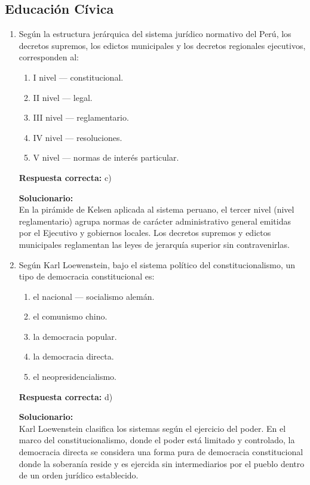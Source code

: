 \subsection*{Educación Cívica}

\begin{enumerate}
	
	\item Según la estructura jerárquica del sistema jurídico normativo del Perú, los decretos supremos, los edictos municipales y los decretos regionales ejecutivos, corresponden al:
	
	\begin{enumerate}[label=\alph*)]
		\item I nivel — constitucional.
		\item II nivel — legal.
		\item III nivel — reglamentario.
		\item IV nivel — resoluciones.
		\item V nivel — normas de interés particular.
	\end{enumerate}
	
	\textbf{Respuesta correcta:} c)
	
	\vspace{2mm}
	\textbf{Solucionario:}\\
	En la pirámide de Kelsen aplicada al sistema peruano, el tercer nivel (nivel reglamentario) agrupa normas de carácter administrativo general emitidas por el Ejecutivo y gobiernos locales. Los decretos supremos y edictos municipales reglamentan las leyes de jerarquía superior sin contravenirlas.
	
	\vspace{6mm}
	
	\item Según Karl Loewenstein, bajo el sistema político del constitucionalismo, un tipo de democracia constitucional es:
	
	\begin{enumerate}[label=\alph*)]
		\item el nacional — socialismo alemán.
		\item el comunismo chino.
		\item la democracia popular.
		\item la democracia directa.
		\item el neopresidencialismo.
	\end{enumerate}
	
	\textbf{Respuesta correcta:} d)
	
	\vspace{2mm}
	\textbf{Solucionario:}\\
	Karl Loewenstein clasifica los sistemas según el ejercicio del poder. En el marco del constitucionalismo, donde el poder está limitado y controlado, la democracia directa se considera una forma pura de democracia constitucional donde la soberanía reside y es ejercida sin intermediarios por el pueblo dentro de un orden jurídico establecido.
	
	\vspace{6mm}
	
\end{enumerate}


